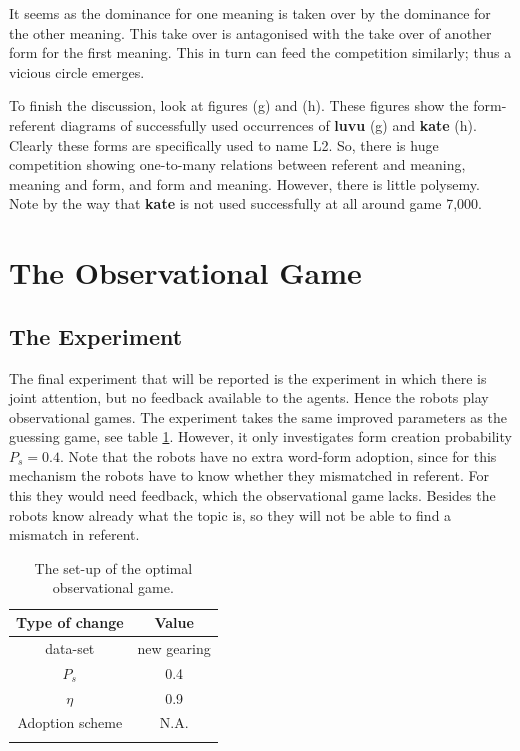 It seems as the dominance for one meaning is taken over by the dominance for the other meaning. This take over is antagonised with the take over of another form for the first meaning. This in turn can feed the competition similarly; thus a vicious circle emerges.


To finish the discussion, look at figures (g) and (h). These figures show the form-referent diagrams of successfully used occurrences of {\bf luvu} (g) and {\bf kate} (h). Clearly these forms are specifically used to name L2. So, there is huge competition showing one-to-many relations between referent and meaning, meaning and form, and form and meaning. However, there is little polysemy. Note by the way that {\bf kate} is not used successfully at all around game 7,000.


\section{The Observational Game}\label{s:opt:oli}

\subsection{The Experiment}

The final experiment that will be reported is the experiment in which there is joint attention, but no feedback available to the agents. Hence the robots play observational games. The experiment takes the same improved parameters as the guessing game, see table \ref{t:opt:oli}. However, it only investigates form creation probability $P_s=0.4$. Note that the robots have no extra word-form adoption, since for this mechanism the robots have to know whether they mismatched in referent. For this they would need feedback, which the observational game lacks. Besides the robots know already what the topic is, so they will not be able to find a mismatch in referent.

\begin{table}[t]
\centering
\begin{tabular}{cc}
\lsptoprule
Type of change & Value\\\midrule
data-set & new gearing\\%
$P_s$ & 0.4\\%
$\eta$ & 0.9\\%
Adoption scheme & N.A.\\%
\lspbottomrule
\end{tabular}
\caption{The set-up of the optimal observational game. }
\label{t:opt:oli}
\end{table}

